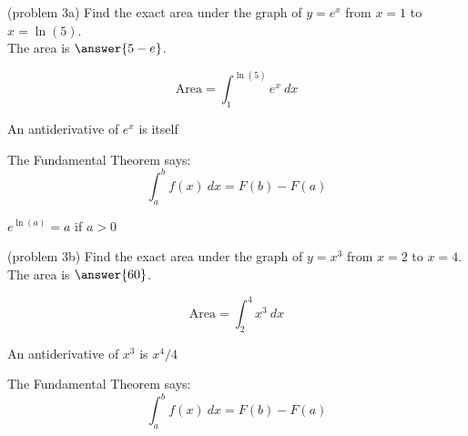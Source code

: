 \documentclass[handout]{ximera}
\begin{document}
\begin{problem}(problem 3a)
 Find the exact area under the graph of $y = e^x$ from $x=1$ to $x = \ln(5)$.\\
The area is $\answer{5-e}$.
 \begin{hint}
 \[
 \text{Area} = \int_1^{\ln(5)} e^x \ dx 
  \]
  \end{hint}
    \begin{hint}
      An antiderivative of $e^x$ is itself
    \end{hint}
    
    \begin{hint}
      The Fundamental Theorem says:
      \[
      \int_a^b f(x) \ dx = F(b) - F(a)
      \]
    \end{hint}   
		\begin{hint}
      $e^{\ln(a)} = a$ if $a > 0$
    \end{hint}
\end{problem}




\begin{problem}(problem 3b)
Find the exact area under the graph of $y = x^3$ from $x = 2$ to $x = 4$.\\
The area is $\answer{60}$.
 \begin{hint}
 \[
  \text{Area}=\int_2^{4} x^3 \ dx
  \]
  \end{hint}
    \begin{hint}
      An antiderivative of $x^3$ is $x^4 /4$
    \end{hint}
    \begin{hint}
      The Fundamental Theorem says:
      \[
      \int_a^b f(x) \ dx = F(b) - F(a)
      \]
    \end{hint}    
		
		
\end{problem}
\end{document}
